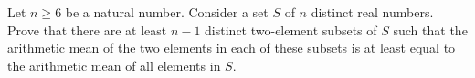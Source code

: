 Let $n \geq 6$ be a natural number. Consider a set $S$ of $n$ distinct real numbers.
Prove that there are at least $n-1$ distinct two-element subsets of $S$ such that the arithmetic
mean of the two elements in each of these subsets is at
least equal to the arithmetic mean of all elements in $S$.